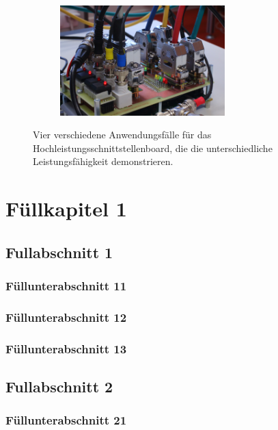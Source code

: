 \documentclass[arbeit=master,oneside,BCOR=12mm]{ArbeitRST}
\begin{document}
\begin{figure}[ht]
\begin{subfigure}[c]{0.5\textwidth}
\centering
\includegraphics[width=0.7\textwidth]{bild}
\end{subfigure}
\caption{Vier verschiedene Anwendungsfälle für das Hochleistungsschnittstellenboard, die die unterschiedliche Leistungsfähigkeit demonstrieren.}
\end{figure}

\Blindtext[3][2]



\chapter{Füllkapitel 1}
\section{Fullabschnitt 1}
\subsection{Füllunterabschnitt 11}
\Blindtext[1][1]
\subsection{Füllunterabschnitt 12}
\Blindtext[1][1]
\subsection{Füllunterabschnitt 13}
\Blindtext[1][1]


\section{Fullabschnitt 2}
\subsection{Füllunterabschnitt 21}
\Blindtext[1][1]
\end{document}
